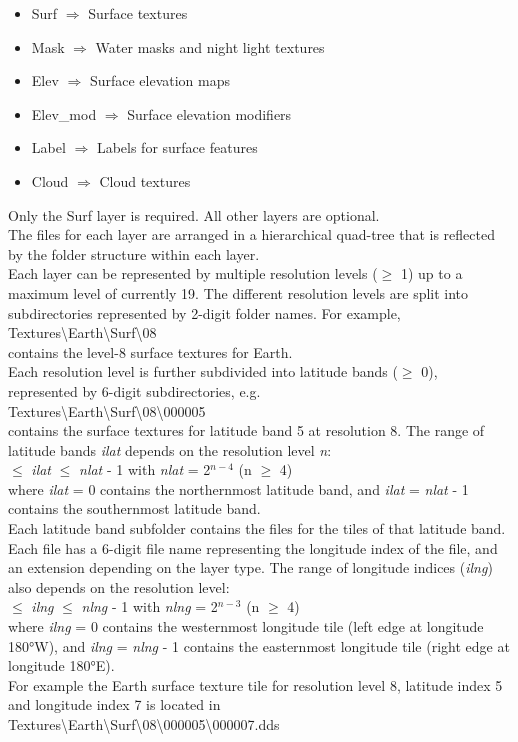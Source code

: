 \documentclass[Orbiter Developer Manual.tex]{subfiles}
\begin{document}
\begin{itemize}
\item Surf $\Rightarrow$ Surface textures
\item Mask $\Rightarrow$ Water masks and night light textures
\item Elev $\Rightarrow$ Surface elevation maps
\item Elev\_mod $\Rightarrow$ Surface elevation modifiers
\item Label $\Rightarrow$ Labels for surface features
\item Cloud $\Rightarrow$ Cloud textures
\end{itemize}

\noindent
Only the Surf layer is required. All other layers are optional.\\
The files for each layer are arranged in a hierarchical quad-tree that is reflected by the folder structure within each layer.\\
Each layer can be represented by multiple resolution levels ($\geq$ 1) up to a maximum level of currently 19. The different resolution levels are split into subdirectories represented by 2-digit folder names. For example,\\
\indent Textures\textbackslash Earth\textbackslash Surf\textbackslash 08\\
contains the level-8 surface textures for Earth.\\
Each resolution level is further subdivided into latitude bands ($\geq$ 0), represented by 6-digit subdirectories, e.g.\\
\indent Textures\textbackslash Earth\textbackslash Surf\textbackslash 08\textbackslash 000005\\
contains the surface textures for latitude band 5 at resolution 8. The range of latitude bands \textit{ilat} depends on the resolution level \textit{n}:\\
 $\leq$ \textit{ilat} $\leq$ \textit{nlat} - 1  with  \textit{nlat} = 2$^{n-4}$  (n $\geq$ 4)\\
where \textit{ilat} = 0 contains the northernmost latitude band, and \textit{ilat} = \textit{nlat} - 1 contains the southernmost latitude band.\\
Each latitude band subfolder contains the files for the tiles of that latitude band. Each file has a 6-digit file name representing the longitude index of the file, and an extension depending on the layer type. The range of longitude indices (\textit{ilng}) also depends on the resolution level:\\
 $\leq$ \textit{ilng} $\leq$ \textit{nlng} - 1  with  \textit{nlng} = 2$^{n-3}$  (n $\geq$ 4)\\
where \textit{ilng} = 0 contains the westernmost longitude tile (left edge at longitude 180°W), and \textit{ilng} = \textit{nlng} - 1 contains the easternmost longitude tile (right edge at longitude 180°E).\\
For example the Earth surface texture tile for resolution level 8, latitude index 5 and longitude index 7 is located in\\
\indent Textures\textbackslash Earth\textbackslash Surf\textbackslash 08\textbackslash 000005\textbackslash 000007.dds
\end{document}
